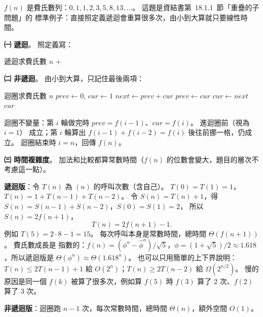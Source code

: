 \begin{pastsoln}
$f(n)$ 是費氏數列：$0, 1, 1, 2, 3, 5, 8, 13, \ldots$。 這題是資結書第~18.1.1~節「重疊的子問題」的
標準例子：直接照定義遞迴會重算很多次，由小到大算就只要線性時間。

\textbf{㈠ 遞迴}。 照定義寫：
\begin{pseudo}{遞迴求費氏數}
        \State \Return $n$ 
    \EndIf
    \State \Return {} $+$ 
\EndFunction
\end{pseudo}

\textbf{㈡ 非遞迴}。 由小到大算，只記住最後兩項：
\begin{pseudo}{迴圈求費氏數}
        \State \Return $n$
    \EndIf
    \State $\mathit{prev} \gets 0$, $\mathit{cur} \gets 1$ 
        \State $\mathit{next} \gets \mathit{prev} + \mathit{cur}$ 
        \State $\mathit{prev} \gets \mathit{cur}$
        \State $\mathit{cur} \gets \mathit{next}$
    \EndFor
    \State \Return $\mathit{cur}$
\EndFunction
\end{pseudo}
迴圈不變量：第 $i$ 輪做完時 $\mathit{prev} = f(i-1)$、$\mathit{cur} = f(i)$。 進迴圈前（視為 $i = 1$）
成立；第 $i$ 輪算出 $f(i-1) + f(i-2) = f(i)$ 後往前挪一格，仍成立。 迴圈結束時 $i = n$，回傳
$f(n)$。

\textbf{㈢ 時間複雜度}。 加法和比較都算常數時間（$f(n)$ 的位數會變大，題目的層次不考慮這一點）。

\textbf{遞迴版}：令 $T(n)$ 為 $(n)$ 的呼叫次數（含自己）。 $T(0) = T(1) = 1$，
$T(n) = 1 + T(n-1) + T(n-2)$。 令 $S(n) = T(n) + 1$，得 $S(n) = S(n-1) + S(n-2)$，$S(0) = S(1) = 2$，
所以 $S(n) = 2f(n+1)$，
\[
T(n) = 2f(n+1) - 1 .
\]
例如 $T(5) = 2 \cdot 8 - 1 = 15$。 每次呼叫本身是常數時間，總時間 $\Theta(f(n+1))$。 費氏數成長是
指數的：$f(n) = (\phi^n - \hat\phi^n)/\sqrt 5$，$\phi = (1 + \sqrt 5)/2 \approx 1.618$，所以遞迴版是
$\Theta(\phi^n) \approx \Theta(1.618^n)$。 也可以只用簡單的上下界說明：$T(n) \le 2T(n-1) + 1$ 給
$O(2^n)$；$T(n) \ge 2T(n-2)$ 給 $\Omega(2^{n/2})$。 慢的原因是同一個 $f(k)$ 被算了很多次，例如算
$f(5)$ 時 $f(3)$ 算了 $2$ 次、$f(2)$ 算了 $3$ 次。

\textbf{非遞迴版}：迴圈跑 $n - 1$ 次，每次常數時間，總時間 $\Theta(n)$，額外空間 $O(1)$。
\end{pastsoln}
